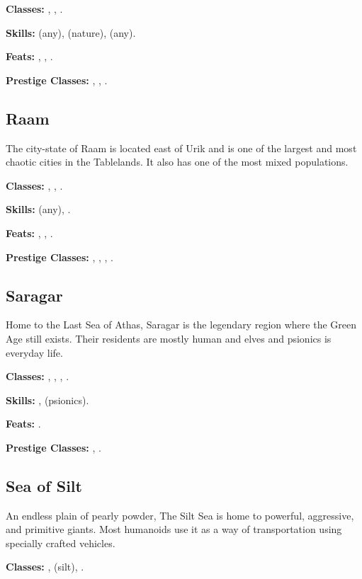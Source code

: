 \textbf{Classes:} , , .

\textbf{Skills:}  (any),  (nature),  (any).

\textbf{Feats:} , , .

\textbf{Prestige Classes:} , , .

\subsection{Raam}
The city-state of Raam is located east of Urik and is one of the largest and most chaotic cities in the Tablelands. It also has one of the most mixed populations.

\textbf{Classes:} , , .

\textbf{Skills:}  (any), .

\textbf{Feats:} , , .

\textbf{Prestige Classes:} , , , .

\subsection{Saragar}
Home to the Last Sea of Athas, Saragar is the legendary region where the Green Age still exists. Their residents are mostly human and elves and psionics is everyday life.

\textbf{Classes:} , , , .

\textbf{Skills:} ,  (psionics).

\textbf{Feats:} .

\textbf{Prestige Classes:} , .


\subsection{Sea of Silt}
An endless plain of pearly powder, The Silt Sea is home to powerful, aggressive, and primitive giants. Most humanoids use it as a way of transportation using specially crafted vehicles.

\textbf{Classes:} ,  (silt), .

